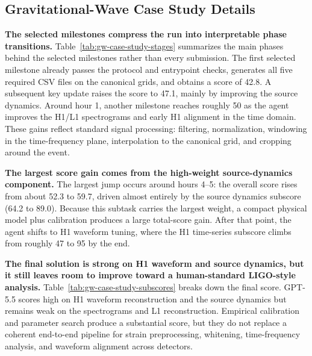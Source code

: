 \subsection{Gravitational-Wave Case Study Details}
\label{sec:appendix-gw-case-study-details}

\textbf{The selected milestones compress the run into interpretable phase transitions.} Table~\ref{tab:gw-case-study-stages} summarizes the main phases behind the selected milestones rather than every submission. The first selected milestone already passes the protocol and entrypoint checks, generates all five required CSV files on the canonical grids, and obtains a score of 42.8. A subsequent key update raises the score to 47.1, mainly by improving the source dynamics. Around hour 1, another milestone reaches roughly 50 as the agent improves the H1/L1 spectrograms and early H1 alignment in the time domain. These gains reflect standard signal processing: filtering, normalization, windowing in the time-frequency plane, interpolation to the canonical grid, and cropping around the event.

\textbf{The largest score gain comes from the high-weight source-dynamics component.} The largest jump occurs around hours 4--5: the overall score rises from about 52.3 to 59.7, driven almost entirely by the source dynamics subscore (64.2 to 89.0). Because this subtask carries the largest weight, a compact physical model plus calibration produces a large total-score gain. After that point, the agent shifts to H1 waveform tuning, where the H1 time-series subscore climbs from roughly 47 to 95 by the end.

\textbf{The final solution is strong on H1 waveform and source dynamics, but it still leaves room to improve toward a human-standard LIGO-style analysis.} Table~\ref{tab:gw-case-study-subscores} breaks down the final score. GPT-5.5 scores high on H1 waveform reconstruction and the source dynamics but remains weak on the spectrograms and L1 reconstruction. Empirical calibration and parameter search produce a substantial score, but they do not replace a coherent end-to-end pipeline for strain preprocessing, whitening, time-frequency analysis, and waveform alignment across detectors.

